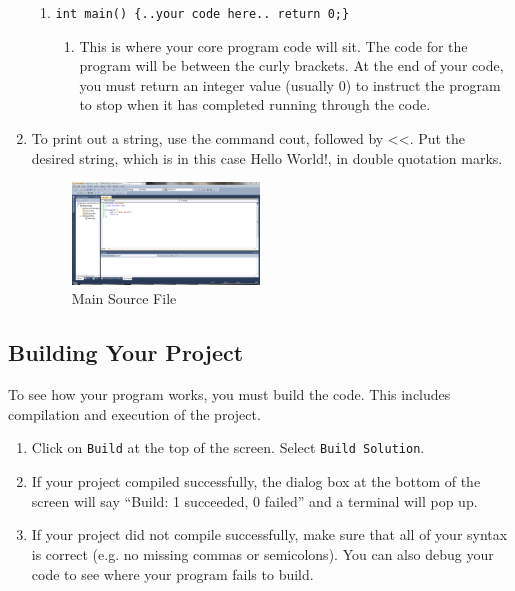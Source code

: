 \documentclass[twocolumn]{article}
\begin{document}
\begin{enumerate}
\begin{enumerate}
	  \item \texttt{int main() \{..your code here.. return 0;\}}
	\begin{enumerate}
	  \item This is where your core program code will sit. The code for the program will be between the curly brackets. At the end of your code, you must return an integer value (usually 0) to instruct the program to stop when it has completed running through the code.
	\end{enumerate}
	\end{enumerate}
	\item To print out a string, use the command cout, followed by \textless \textless. Put the desired string, which is in this case Hello World!, in double quotation marks. 
	\begin{figure}[htbp]
		\centering
		\includegraphics[width=0.47\textwidth]{4.png}
		\caption{Main Source File}
		\label{fig:main}
	\end{figure}
\end{enumerate}
	

\subsection{Building Your Project} To see how your program works, you must build the code. This includes compilation and execution of the project.
\begin{enumerate}
  \item Click on \texttt{Build} at the top of the screen. Select \texttt{Build Solution}. 
  \item If your project compiled successfully, the dialog box at the bottom of the screen will say “Build: 1 succeeded, 0 failed” and a terminal will pop up.
\item If your project did not compile successfully, make sure that all of your syntax is correct (e.g. no missing commas or semicolons). You can also debug your code to see where your program fails to build.
\end{enumerate}
\end{document}
